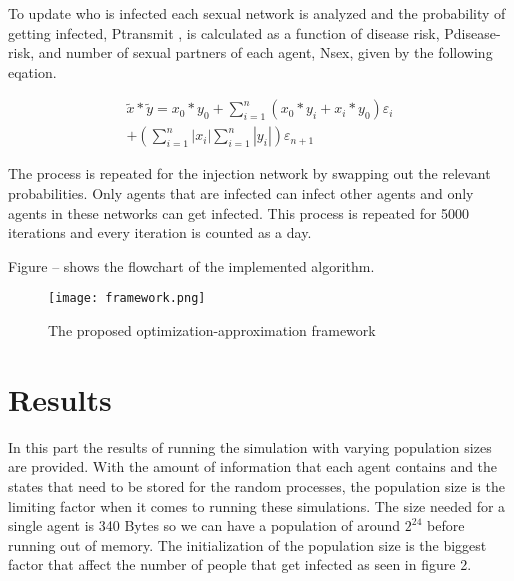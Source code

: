 \documentclass[conference]{IEEEtran}
\begin{document}
To update who is infected each sexual network is analyzed and the probability of getting infected, Ptransmit , is calculated as a function of disease risk, Pdisease-risk, and number of sexual partners of each agent, Nsex, given by the following eqation. \par

\begin{equation}
\begin{split}
\tilde{x}*\tilde{y} = {x_0}*{y_0} + \sum\limits_{i=1}^{n} {({x_0}*{y_i}+{x_i}*{y_0})\varepsilon_i}\\
+ (\sum\limits_{i=1}^{n} {|{x_i}|}\sum\limits_{i=1}^{n} {|{y_i}|}){\varepsilon_{n+1}} \;\;\;\;\;\;\;\;\;\;\;\;
\end{split}
\end{equation}

The process is repeated for the injection network by swapping out the relevant probabilities.  Only agents that are infected can infect other agents and only agents in these networks can get infected. This process is repeated for 5000 iterations and every iteration is counted as a day.\par
Figure -- shows the flowchart of the implemented algorithm.\par

\begin{figure}[!t]
\centering
\texttt{[image: framework.png]}
\caption{The proposed optimization-approximation framework}
\label{fig_sim}
\end{figure}


\section{Results}

In this part the results of running the simulation with varying population sizes are provided. With the amount of information that each agent contains and the states that need to be stored for the random processes, the population size is the limiting factor when it comes to running these simulations. The size needed for a single agent is 340 Bytes so we can have a population of around $2^{24}$ before running out of memory. The initialization of the population size is the biggest factor that affect the number of people that get infected as seen in figure 2.\par

\end{document}
